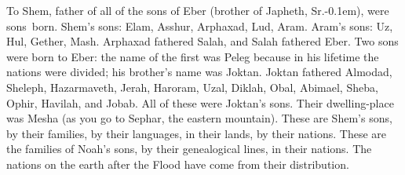 \begin{inparaenum}
   To Shem, father of all of the sons of Eber (brother of Japheth, Sr.\kern-0.1em), were sons\understood{}\ born.%
   Shem's sons: Elam, Asshur, Arphaxad, Lud, Aram.%
   Aram's sons: Uz, Hul, Gether, Mash.%
   Arphaxad fathered Salah, and Salah fathered Eber.%
   Two sons were born to Eber: the name of the first was Peleg because in his lifetime the nations were divided; his brother's name was Joktan.%
   Joktan fathered Almodad, Sheleph, Hazarmaveth, Jerah,%
   Haroram, Uzal, Diklah,%
   Obal, Abimael, Sheba,%
   Ophir, Havilah, and Jobab. All of these were Joktan's sons.%
   Their dwelling-place was Mesha (as you go to Sephar, the eastern mountain).%
   These are Shem's sons, by their families, by their languages, in their lands, by their nations.%
   These are the families of Noah's sons, by their genealogical lines, in their nations. The nations on the earth after the Flood have come from their distribution.%
\end{inparaenum}
